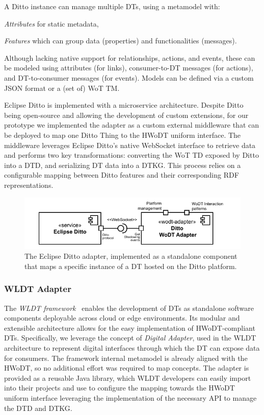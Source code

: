 A Ditto instance can manage multiple \acp{DT}, using a metamodel with:
\begin{inlinelist}
    \item \emph{Attributes} for static metadata,
    \item \emph{Features} which can group data (properties) and functionalities (messages).
\end{inlinelist}
Although lacking native support for relationships, actions, and events, these can be modeled using attributes (for links), consumer-to-\ac{DT} messages (for actions), and \ac{DT}-to-consumer messages (for events). Models can be defined via a custom JSON format or a (set of) \ac{WoT} \ac{TM}.

Eclipse Ditto is implemented with a microservice architecture. 
Despite Ditto being open-source and allowing the development of custom extensions, for our prototype we implemented the adapter as a custom external middleware that can be deployed to map one Ditto Thing to the \ac{HWoDT} uniform interface.
%
The middleware leverages Eclipse Ditto’s native WebSocket interface to retrieve data and performs two key transformations: converting the \ac{WoT} \ac{TD} exposed by Ditto into a \ac{DTD}, and serializing \ac{DT} data into a \ac{DTKG}.
This process relies on a configurable mapping between Ditto features and their corresponding \ac{RDF} representations.

\begin{figure}[t]
  \centering
  \includegraphics[width=0.8\columnwidth]{figures/hwodt/ditto-adapter-c&c.pdf}
  \caption{The Eclipse Ditto adapter, implemented as a standalone component that maps a specific instance of a \ac{DT} hosted on the Ditto platform.}
  \label{fig:ditto-adapter-c&c}
\end{figure}

\subsubsection{\acl{WLDT} Adapter}

The \emph{\acf{WLDT} framework}~\cite{picone2021wldt} enables the development of \acp{DT} as standalone software components deployable across cloud or edge environments.
Its modular and extensible architecture allows for the easy implementation of \ac{HWoDT}-compliant \acp{DT}.
Specifically, we leverage the concept of \emph{Digital Adapter}, used in the \ac{WLDT} architecture to represent digital interfaces through which the \ac{DT} can expose data for consumers.
%
The framework internal metamodel is already aligned with the \ac{HWoDT}, so no additional effort was required to map concepts.
The adapter is provided as a reusable Java library, which \ac{WLDT} developers can easily import into their projects and use to configure the mapping towards the \ac{HWoDT} uniform interface leveraging the implementation of the necessary \ac{API} to manage the \ac{DTD} and \ac{DTKG}.

